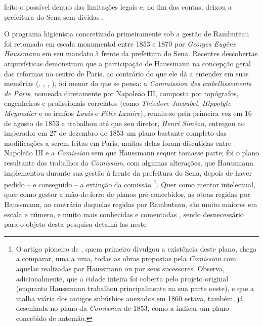 feito o possível dentro das limitações legais e, no fim das contas, deixou a prefeitura do Sena sem dívidas \cite[p.~399]{rambuteau1905memoires}. 

O programa higienista concretizado primeiramente sob a gestão de Rambuteau foi retomado em escala monumental entre 1853 e 1870 por \textit{Georges Eugène Haussmann} em seu mandato à frente da prefeitura do Sena. Recentes descobertas arquivísticas demonstram que a participação de Haussmann na concepção geral das reformas no centro de Paris, ao contrário do que ele dá a entender em suas memórias (\citeauthor{haussmann1890memoires-1}, \citeyear{haussmann1890memoires-1}, \citeyear{haussmann1890memoires-2}, \citeyear{haussmann1890memoires-3}), foi menor do que se pensa: a \textit{Commission des embellissements de Paris}, nomeada diretamente por Napoleão III, composta por topógrafos, engenheiros e profissionais correlatos (como \textit{Théodore Jacoubet}, \textit{Hippolyte Meynadier} e os irmãos \textit{Louis} e \textit{Félix Lazaire}), reuniu-se pela primeira vez em 16 de agosto de 1853 e trabalhou até que seu diretor, \textit{Henri Siméon}, entregou ao imperador em 27 de dezembro de 1853 um plano bastante completo das modificações a serem feitas em Paris; muitas delas foram discutidas entre Napoleão III e a \textit{Comission} sem que Haussmann sequer tomasse parte; foi o plano resultante dos trabalhos da \textit{Comission}, com algumas alterações, que Haussmann implementou durante sua gestão à frente da prefeitura do Sena, depois de haver pedido -- e conseguido -- a extinção da comissão \cite{bourillon_changer_1999,casselle_embel_1997}\footnote{O artigo pioneiro de , quem primeiro divulgou a existência deste plano, chega a comparar, uma a uma, todas as obras propostas pela \textit{Comission} com aquelas realizadas por Haussmann ou por seus sucessores. Observa, adicionalmente, que a cidade inteira foi coberta pelo projeto original (enquanto Haussmann trabalhou principalmente na sua parte oeste), e que a malha viária dos antigos subúrbios anexados em 1860 estava, também, já desenhada no plano da \textit{Comission} de 1853, como a indicar um plano concebido de antemão.}. Quer como mentor intelectual, quer como gestor a mão-de-ferro de planos pré-concebidos, as obras regidas por Haussmann, ao contrário daquelas regidas por Rambuteau, são muito maiores em escala e número, e muito mais conhecidas e comentadas \cite{bourillon_changer_1999, casselle_embel_1997, dansette_haussmann_1972, faure_paris_2004, hourticq_haussmann_1971, petti_eurfranba_2011, pinkney_ordevpar_1955, pinkney_paris_1957, vossen_villes_1947}, sendo desnecessário para o objeto desta pesquisa detalhá-las neste 